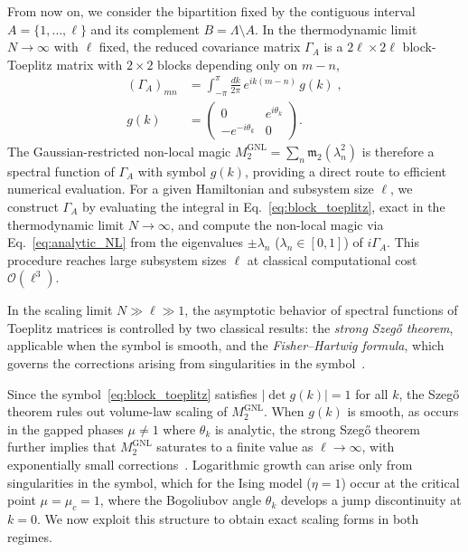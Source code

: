 \documentclass[prx,twocolumn,superscriptaddress,aps,10pt, frontmatterverbose, reprint,footinbib,longbibliography=true]{revtex4-2}
\begin{document}
From now on, we consider the bipartition fixed by the contiguous interval $A=\{1,\dots,\ell\}$ and its complement $B=\Lambda\setminus A$.
In the thermodynamic limit $N\to\infty$ with $\ell$ fixed, the reduced covariance matrix $\Gamma_A$ is a $2\ell\times 2\ell$ block-Toeplitz matrix with $2\times 2$ blocks depending only on $m-n$,
\begin{equation}
\begin{split}
    (\Gamma_A)_{mn} &= \int_{-\pi}^{\pi}\frac{dk}{2\pi}\,e^{ik(m-n)}\,g(k)\;,
    \\
    g(k) &= \begin{pmatrix} 0 & e^{i\theta_k} \\ -e^{-i\theta_k} & 0 \end{pmatrix}.
\end{split}
\label{eq:block_toeplitz}
\end{equation}
The Gaussian-restricted non-local magic $M_2^{\mathrm{GNL}} = \sum_n \mathfrak{m}_2(\lambda_n^2)$ is therefore a spectral function of $\Gamma_A$ with symbol $g(k)$, providing a direct route to efficient numerical evaluation.
For a given Hamiltonian and subsystem size $\ell$, we construct $\Gamma_A$ by evaluating the integral in Eq.~\eqref{eq:block_toeplitz}, exact in the thermodynamic limit $N\to\infty$, and compute the non-local magic via Eq.~\eqref{eq:analytic_NL} from the eigenvalues $\pm\lambda_n$ ($\lambda_n\in[0,1]$) of $i\Gamma_A$.
This procedure reaches large subsystem sizes $\ell$ at classical computational cost $\mathcal{O}(\ell^3)$.

In the scaling limit $N\gg \ell\gg 1$, the asymptotic behavior of spectral functions of Toeplitz matrices is controlled by two classical results: the \emph{strong Szeg\H{o} theorem}, applicable when the symbol is smooth, and the \emph{Fisher--Hartwig formula}, which governs the corrections arising from singularities in the symbol~\cite{Jin_2004,Its_2005}.

Since the symbol~\eqref{eq:block_toeplitz} satisfies $|\det g(k)| = 1$ for all $k$, the Szeg\H{o} theorem rules out volume-law scaling of $M_2^{\mathrm{GNL}}$.
When $g(k)$ is smooth, as occurs in the gapped phases $\mu \neq 1$ where $\theta_k$ is analytic, the strong Szeg\H{o} theorem further implies that $M_2^{\mathrm{GNL}}$ saturates to a finite value as $\ell \to \infty$, with exponentially small corrections~\cite{simon2010szego}.
Logarithmic growth can arise only from singularities in the symbol, which for the Ising model ($\eta=1$) occur at the critical point $\mu = \mu_c = 1$, where the Bogoliubov angle $\theta_k$ develops a jump discontinuity at $k = 0$.
We now exploit this structure to obtain exact scaling forms in both regimes.
\end{document}

